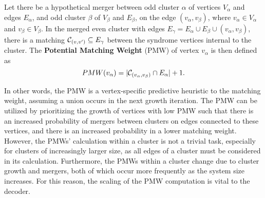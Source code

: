 \begin{definition}\label{def:pmw}
    Let there be a hypothetical merger between odd cluster $\alpha$ of vertices $V_\alpha$ and edges $E_\alpha$, and odd cluster $\beta$ of $V_\beta$ and $E_\beta$, on the edge $(v_\alpha, v_\beta)$, where $v_\alpha \in V_\alpha$ and $v_\beta \in V_\beta$. In the merged even cluster with edges $E_{\gamma} = E_\alpha \cup E_\beta \cup (v_\alpha, v_\beta)$, there is a matching $\mathcal{C}_{(v,v')} \subseteq E_{\gamma}$  between the syndrome vertices internal to the cluster. The \textbf{Potential Matching Weight} (PMW) of vertex $v_\alpha$ is then defined as
    \begin{equation}
      PMW(v_\alpha) = \lvert\mathcal{C}_{(v_\alpha,v_\beta)} \cap E_\alpha\rvert + 1.
    \end{equation}
\end{definition}

In other words, the PMW is a vertex-specific predictive heuristic to the matching weight, assuming a union occurs in the next growth iteration. The PMW can be utilized by prioritizing the growth of vertices with low PMW such that there is an increased probability of mergers between clusters on edges connected to these vertices, and there is an increased probability in a lower matching weight. However, the PMWs' calculation within a cluster is not a trivial task, especially for clusters of increasingly larger size, as all edges of a cluster must be considered in its calculation. Furthermore, the PMWs within a cluster change due to cluster growth and mergers, both of which occur more frequently as the system size increases. For this reason, the scaling of the PMW computation is vital to the decoder. 

